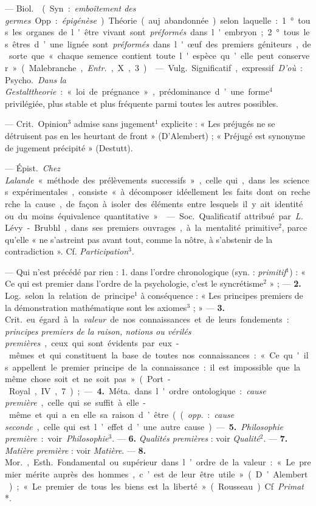 \begin{itemize}[leftmargin=1cm, label=, itemsep=1pt]
 — \si{Biol.}  (Syn. : {\it emboîtement des
germes}. Opp. : {\it épigénèse}). Théorie (auj. abandonnée) selon laquelle :
1° tous les organes de l'être vivant sont {\it préformés} dans l'embryon; 2°
tous les êtres d’une lignée sont {\it préformés} dans l'œuf des premiers
géniteurs, de sorte que « chaque semence contient toute l'espèce qu’elle peut
conserver » (Malebranche, {\it Entr.}, X, 3).

 — \si{Vulg.} Significatif, expressif. {\it D'où} : \si{Psycho.}
{\it Dans la Gestalttheorie} :
« loi de prégnance », prédominance d’une forme$^4$ privilégiée, plus stable
et plus fréquente parmi toutes les autres possibles.

 — \si{Crit.} Opinion$^3$ admise sans jugement$^1$ explicite : «
Les préjugés ne se détruisent pas en les heurtant de front » (D’Alembert) ; «
Préjugé est synonyme de jugement précipité » (Destutt).

 — \si{Épist.} {\it Chez Lalande} « méthode des prélèvements
successifs », celle qui, dans les sciences expérimentales, consiste « à
décomposer idéellement les faits dont on recherche la cause, de façon à
isoler des éléments entre lesquels il y ait identité ou du moins équivalence
quantitative ».

 — \si{Soc.} Qualificatif attribué par {\it L.} Lévy-Brubhl,
dans ses premiers ouvrages, à la mentalité primitive$^2$, parce qu'elle « ne
s’astreint pas avant tout, comme la nôtre, à s'abstenir de la contradiction
». Cf. {\it Participation}$^3$.

 — Qui n’est précédé par rien : 1. dans l’ordre chronologique
(syn. : {\it primitif}$^1$) : « Ce qui est premier dans l’ordre de la
psychologie, c’est le syncrétisme$^2$ » ; — {\bf 2.} \si{Log.} selon la
relation de principe$^1$ à conséquence : « Les principes premiers de la
démonstration mathématique sont les axiomes$^3$ ; » — {\bf 3.} \si{Crit.} eu
égard à la {\it valeur} de nos connaissances et de leurs fondements : {\it
principes premiers de la raison, notions ou vérilés premières}, ceux qui sont
évidents par eux-mêmes et qui constituent la base de toutes nos
connaissances : « Ce qu'ils appellent le premier principe de la
connaissance : il est impossible que la même chose soit et ne soit pas
» (Port-Royal, IV, 7) ; —
{\bf 4.} \si{Méta.} dans l'ordre ontologique : {\it cause première}, celle
qui se suffit à elle-même et qui a en elle sa raison d’être (({\it opp.} :
{\it cause seconde}, celle qui est l’effet d’une autre cause). —  {\bf 5.}
{\it Philosophie première} : voir {\it Philosophie}$^3$. — {\bf 6.} {\it
Qualités premières} : voir {\it Qualité}$^2$. — {\bf 7.} {\it Matière
première} : voir {\it Matière}. — {\bf 8.} \si{Mor.}, \si{Esth.} Fondamental
ou supérieur dans l’ordre de la valeur : « Le premier mérite auprès des
hommes, c’est de leur être utile » (D’Alembert) ; « Le premier de tous les
biens est la liberté» (Rousseau). Cf. {\it Primat}*.


\end{itemize}

